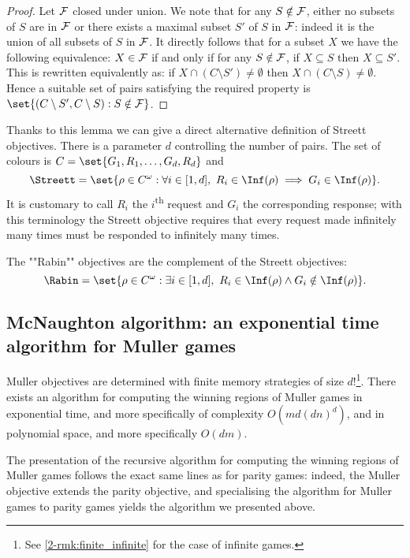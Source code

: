 \begin{proof}
Let $\mathcal{F}$ closed under union.
We note that for any $S \notin \mathcal{F}$, either no subsets of $S$ are in $\mathcal{F}$ or there exists a maximal subset $S'$ of $S$ in $\mathcal{F}$:
indeed it is the union of all subsets of $S$ in $\mathcal{F}$.
It directly follows that for a subset $X$ we have the following equivalence:
$X \in \mathcal{F}$ if and only if for any $S \notin \mathcal{F}$, if $X \subseteq S$ then $X \subseteq S'$.
This is rewritten equivalently as: if $X \cap (C \setminus S') \neq \emptyset$ then $X \cap (C \setminus S) \neq \emptyset$.
Hence a suitable set of pairs satisfying the required property is 
$\set{(C \setminus S', C \setminus S) : S \notin \F}$.
\end{proof}
Thanks to this lemma we can give a direct alternative definition of Streett objectives.
There is a parameter $d$ controlling the number of pairs.
The set of colours is $C = \set{G_1,R_1,\dots,G_d,R_d}$ and
\[
\Streett = \set{ \rho \in C^\omega : \forall i \in [1,d],\ R_i \in \Inf(\rho) \implies G_i \in \Inf(\rho) }.
\]
It is customary to call $R_i$ the $i$\textsuperscript{th} request and $G_i$ the corresponding response;
with this terminology the Streett objective requires that every request made infinitely many times must be responded to infinitely many times.

The ""Rabin"" objectives are the complement of the Streett objectives: 
\[
\Rabin = \set{ \rho \in C^\omega : \exists i \in [1,d],\ R_i \in \Inf(\rho) \wedge G_i \notin \Inf(\rho) }.
\]

\subsection*{McNaughton algorithm: an exponential time algorithm for Muller games}
\begin{theorem}
\label{2-thm:muller}
Muller objectives are determined with finite memory strategies of size $d!$\footnote{See \cref{2-rmk:finite_infinite} for the case of infinite games.}.
There exists an algorithm for computing the winning regions of Muller games in exponential time,
and more specifically of complexity $O(m d (dn)^d)$, and in polynomial space, and more specifically $O(dm)$.
\end{theorem}
The presentation of the recursive algorithm for computing the winning regions of Muller games follows the exact same lines as for parity games:
indeed, the Muller objective extends the parity objective, and specialising the algorithm for Muller games to parity games
yields the algorithm we presented above.

